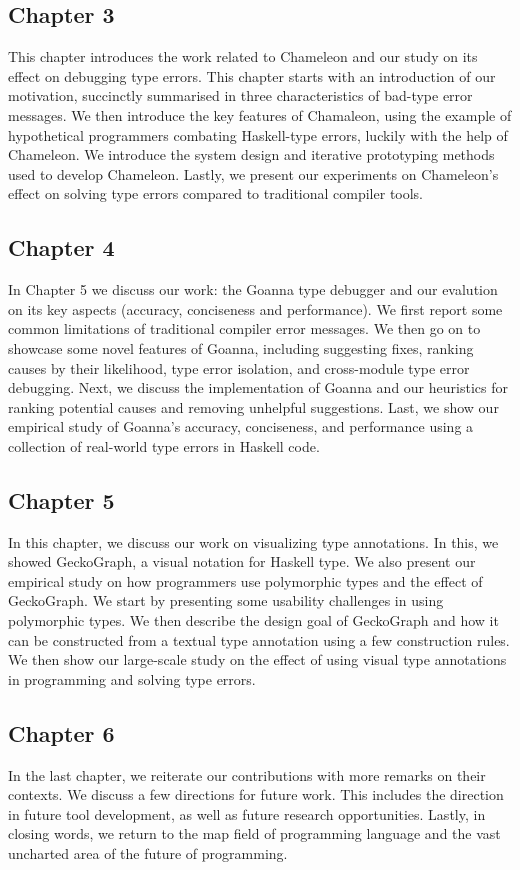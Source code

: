 \subsection{Chapter 3}
This chapter introduces the work related to Chameleon and our study on its effect on debugging type errors. This chapter starts with an introduction of our motivation, succinctly summarised in three characteristics of bad-type error messages. We then introduce the key features of Chamaleon, using the example of hypothetical programmers combating Haskell-type errors, luckily with the help of Chameleon. We introduce the system design and iterative prototyping methods used to develop Chameleon. Lastly, we present our experiments on Chameleon's effect on solving type errors compared to traditional compiler tools. 


\subsection{Chapter 4}

In Chapter 5 we discuss our work: the Goanna type debugger and our evalution on its key aspects (accuracy, conciseness and performance). We first report some common limitations of traditional compiler error messages. We then go on to showcase some novel features of Goanna, including suggesting fixes, ranking causes by their likelihood, type error isolation, and cross-module type error debugging.  Next, we discuss the implementation of Goanna and our heuristics for ranking potential causes and removing unhelpful suggestions. Last, we show our empirical study of Goanna's accuracy, conciseness, and performance using a collection of real-world type errors in Haskell code. 

\subsection{Chapter 5}

In this chapter, we discuss our work on visualizing type annotations. In this, we showed GeckoGraph, a visual notation for Haskell type. We also present our empirical study on how programmers use polymorphic types and the effect of GeckoGraph. We start by presenting some usability challenges in using polymorphic types. We then describe the design goal of GeckoGraph and how it can be constructed from a textual type annotation using a few construction rules. We then show our large-scale study on the effect of using visual type annotations in programming and solving type errors. 


\subsection{Chapter 6}

In the last chapter, we reiterate our contributions with more remarks on their contexts. We discuss a few directions for future work. This includes the direction in future tool development, as well as future research opportunities. Lastly, in closing words, we return to the map field of programming language and the vast uncharted area of the future of programming. 